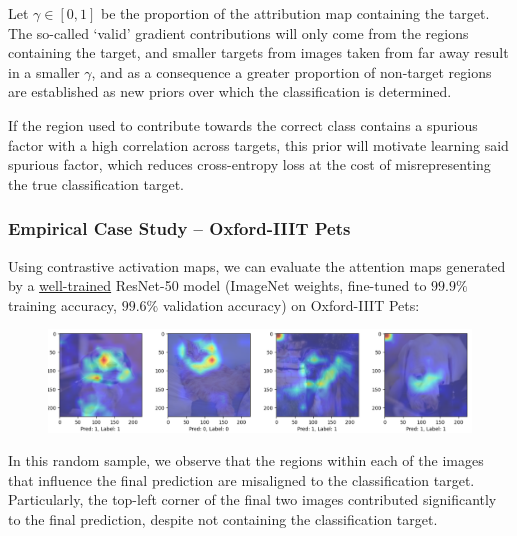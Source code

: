 \documentclass{article}
\theoremstyle{plain}
\theoremstyle{definition}
\theoremstyle{remark}
\begin{document}
	Let $\gamma \in [0, 1]$ be the proportion of the attribution map containing the target. The so-called `valid' gradient contributions will only come from the regions containing the target, and smaller targets from images taken from far away result in a smaller $\gamma$, and as a consequence a greater proportion of non-target regions are established as new priors over which the classification is determined.

	If the region used to contribute towards the correct class contains a spurious factor with a high correlation across targets, this prior will motivate learning said spurious factor, which reduces cross-entropy loss at the cost of misrepresenting the true classification target.

\subsubsection{Empirical Case Study -- Oxford-IIIT Pets}
Using contrastive activation maps, we can evaluate the attention maps generated by a \underline{well-trained} ResNet-50 model (ImageNet weights, fine-tuned to $99.9\%$ training accuracy, $99.6\%$ validation accuracy) on Oxford-IIIT Pets:

\begin{figure}[h!]
	\centering
	\includegraphics[width=\textwidth]{img/default_cams.png}
\end{figure}

In this random sample, we observe that the regions within each of the images that influence the final prediction are misaligned to the classification target. Particularly, the top-left corner of the final two images contributed significantly to the final prediction, despite not containing the classification target.
\end{document}
